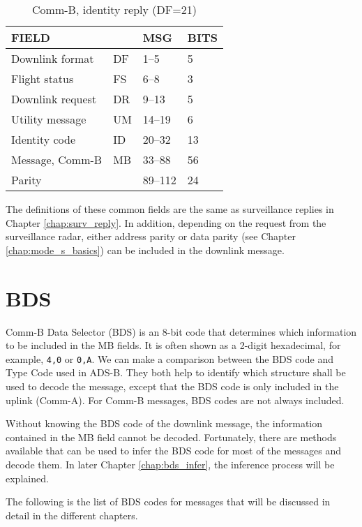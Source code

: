 \begin{table}[ht]
  \centering
  \caption{Comm-B, identity reply (DF=21)}
  \label{tb:df_21_structure}
  \begin{tabular}[t]{|l|l|l|l|}
  \hline
  \textbf{FIELD} & \textbf{} & \textbf{MSG} & \textbf{BITS} \\ \hline
  Downlink format         & DF & 1--5    & 5   \\ \hline
  Flight status           & FS & 6--8    & 3   \\ \hline
  Downlink request        & DR & 9--13   & 5   \\ \hline
  Utility message         & UM & 14--19  & 6   \\ \hline
  Identity code           & ID & 20--32  & 13  \\ \hline
  Message, Comm-B         & MB & 33--88  & 56  \\ \hline
  Parity  &  & 89--112  & 24  \\ \hline
  \end{tabular}
\end{table}

The definitions of these common fields are the same as surveillance replies in Chapter \ref{chap:surv_reply}. In addition, depending on the request from the surveillance radar, either address parity or data parity (see Chapter \ref{chap:mode_s_basics}) can be included in the downlink message.


\section{BDS}

Comm-B Data Selector (BDS) is an 8-bit code that determines which information to be included in the MB fields. It is often shown as a 2-digit hexadecimal, for example, \texttt{4,0} or \texttt{0,A}. We can make a comparison between the BDS code and Type Code used in ADS-B. They both help to identify which structure shall be used to decode the message, except that the BDS code is only included in the uplink (Comm-A). For Comm-B messages, BDS codes are not always included.

Without knowing the BDS code of the downlink message, the information contained in the MB field cannot be decoded. Fortunately, there are methods available that can be used to infer the BDS code for most of the messages and decode them. In later Chapter \ref{chap:bds_infer}, the inference process will be explained.

The following is the list of BDS codes for messages that will be discussed in detail in the different chapters.

